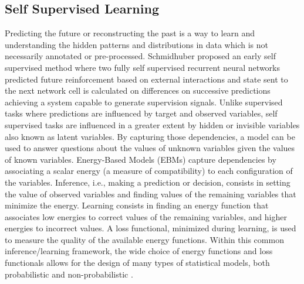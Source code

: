 \documentclass[twocolumn,conference]{article}
\begin{document}
\subsection{Self Supervised Learning}
Predicting the future or reconstructing the past is a way to learn and understanding the hidden patterns and distributions in data which is not necessarily annotated or pre-processed. Schmidhuber proposed an early self supervised method \cite{schmidhuber1990making} where two fully self supervised recurrent neural networks predicted future reinforcement based on external interactions and state sent to the next network cell is calculated on differences on successive predictions achieving a system capable to generate supervision signals. Unlike supervised tasks where predictions are influenced by target and observed variables, self supervised tasks are influenced in a greater extent by hidden or invisible variables also known as latent variables. By capturing those dependencies, a model can be used to answer questions about the values of unknown variables given the values of known variables. Energy-Based Models (EBMs) capture dependencies by associating a scalar energy (a measure of compatibility) to each configuration of the variables. Inference, i.e., making a prediction or decision, consists in setting the value of observed variables and finding values of the remaining variables that minimize the energy. Learning consists in finding an energy function that associates low energies to correct values of the remaining variables, and higher energies to incorrect values. A loss functional, minimized during learning, is used to measure the quality of the available energy functions. Within this common inference/learning framework, the wide choice of energy functions and loss functionals allows for the design of many types of statistical models, both probabilistic and non-probabilistic \cite{lecun2006tutorial}.
\end{document}
